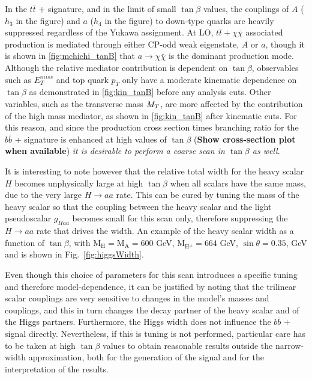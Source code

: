 In the $t\bar{t}$ + \MET signature, and in the limit of small $\tan\beta$ values, the couplings of $A$ ($h_{3}$ in the figure) and $a$ ($h_{4}$ in the figure) to down-type quarks are heavily suppressed regardless of the Yukawa assignment. At LO, $t\bar{t}+\chi\bar{\chi}$ associated production is mediated through either CP-odd weak eigenstate, $A$ or $a$, though it is shown in \autoref{fig:mchichi_tanB} that $a\rightarrow\chi\bar{\chi}$ is the dominant production mode. 
Although the relative mediator contribution is dependent on $\tan\beta$, observables such as $E_{T}^{miss}$ and top quark $p_{T}$ only have a moderate kinematic dependence on $\tan\beta$ as demonstrated in \autoref{fig:kin_tanB} before any analysis cuts. 
Other variables, such as the transverse mass $M_{T}$, are more affected by the contribution of the high mass mediator, as shown in \autoref{fig:kin_tanB} after kinematic cuts. 
For this reason, and since the production cross section times branching ratio for the $b\bar{b}$ + \MET signature is enhanced at high values of $\tan\beta$ (\textbf{Show cross-section plot when available}) \emph{it is desirable to perform a coarse scan in $\tan\beta$ as well}. 

It is interesting to note however that the relative total width for the heavy scalar $H$ becomes unphysically large at high $\tan\beta$ when all scalars have the same mass, due to the very large $H\rightarrow aa$ rate. 
This can be cured by tuning the mass of the heavy scalar so that the coupling between the heavy scalar and the light pseudoscalar $g_{Haa}$ becomes small for this scan only, therefore suppressing the $H\rightarrow aa$ rate that drives the width. An example of the heavy scalar width as a function of $\tan\beta$, with $\mathrm{M_H}=\mathrm{M_A}=600$ GeV, $\mathrm{M_{H^{\pm}}}=664$ GeV, $\sin\theta=0.35$,  GeV and  is shown in Fig.~\ref{fig:higgsWidth}. 

Even though this choice of parameters for this scan introduces a specific tuning and therefore model-dependence, it can be justified by noting that the trilinear scalar couplings are very sensitive to changes in the model's masses and couplings, and this in turn changes the decay partner of the heavy scalar and of the Higgs partners. Furthermore, the Higgs width does not influence the $b\bar{b}$ + \MET signal directly. Nevertheless, if this is tuning is not performed, particular care has to be taken at high $\tan\beta$ values to obtain reasonable results outside the narrow-width approximation, both for the generation of the signal and for the interpretation of the results.  


